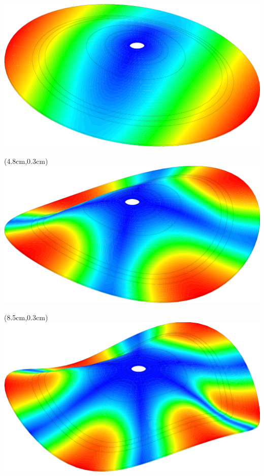 \begin{frame}{}
{\begin{itemize}
{{\begin{textblock*}{5cm}
        \includegraphics[height=0.2\textheight]{images/cymbale_mode_1}
      \end{textblock*}
      \begin{textblock*}{5cm}(4.8cm,0.3cm)
        \includegraphics[height=0.2\textheight]{images/cymbale_mode_2}
      \end{textblock*}
      \begin{textblock*}{5cm}(8.5cm,0.3cm)
        \includegraphics[height=0.2\textheight]{images/cymbale_mode_4}

\end{textblock*}}}
\end{itemize}}
\end{frame}

